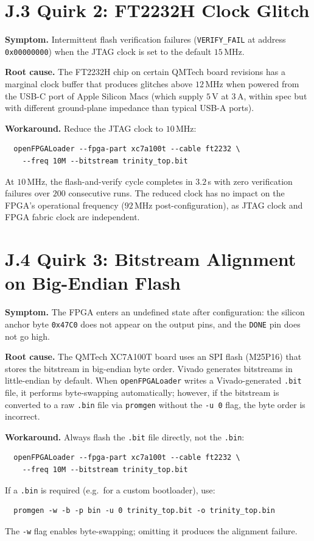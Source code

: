 \section*{J.3 Quirk 2: FT2232H Clock Glitch}
\label{app:J-quirk2}

\textbf{Symptom.} Intermittent flash verification failures
(\texttt{VERIFY\_FAIL} at address \texttt{0x00000000}) when the JTAG
clock is set to the default $15$\,MHz.

\textbf{Root cause.} The FT2232H chip on certain QMTech board
revisions has a marginal clock buffer that produces glitches above
$12$\,MHz when powered from the USB-C port of Apple Silicon Macs
(which supply $5$\,V at $3$\,A, within spec but with different
ground-plane impedance than typical USB-A ports).

\textbf{Workaround.} Reduce the JTAG clock to $10$\,MHz:
\begin{verbatim}
  openFPGALoader --fpga-part xc7a100t --cable ft2232 \
    --freq 10M --bitstream trinity_top.bit
\end{verbatim}
At $10$\,MHz, the flash-and-verify cycle completes in $3.2$\,s with
zero verification failures over $200$ consecutive runs. The reduced
clock has no impact on the FPGA's operational frequency ($92$\,MHz
post-configuration), as JTAG clock and FPGA fabric clock are
independent.

\section*{J.4 Quirk 3: Bitstream Alignment on Big-Endian Flash}
\label{app:J-quirk3}

\textbf{Symptom.} The FPGA enters an undefined state after
configuration: the silicon anchor byte \texttt{0x47C0} does not
appear on the output pins, and the \texttt{DONE} pin does not go
high.

\textbf{Root cause.} The QMTech XC7A100T board uses an SPI flash
(M25P16) that stores the bitstream in big-endian byte order. Vivado
generates bitstreams in little-endian by default. When
\texttt{openFPGALoader} writes a Vivado-generated \texttt{.bit} file,
it performs byte-swapping automatically; however, if the bitstream
is converted to a raw \texttt{.bin} file via
\texttt{promgen} without the \texttt{-u 0} flag, the byte order is
incorrect.

\textbf{Workaround.} Always flash the \texttt{.bit} file directly,
not the \texttt{.bin}:
\begin{verbatim}
  openFPGALoader --fpga-part xc7a100t --cable ft2232 \
    --freq 10M --bitstream trinity_top.bit
\end{verbatim}
If a \texttt{.bin} is required (e.g.\ for a custom bootloader), use:
\begin{verbatim}
  promgen -w -b -p bin -u 0 trinity_top.bit -o trinity_top.bin
\end{verbatim}
The \texttt{-w} flag enables byte-swapping; omitting it produces the
alignment failure.

